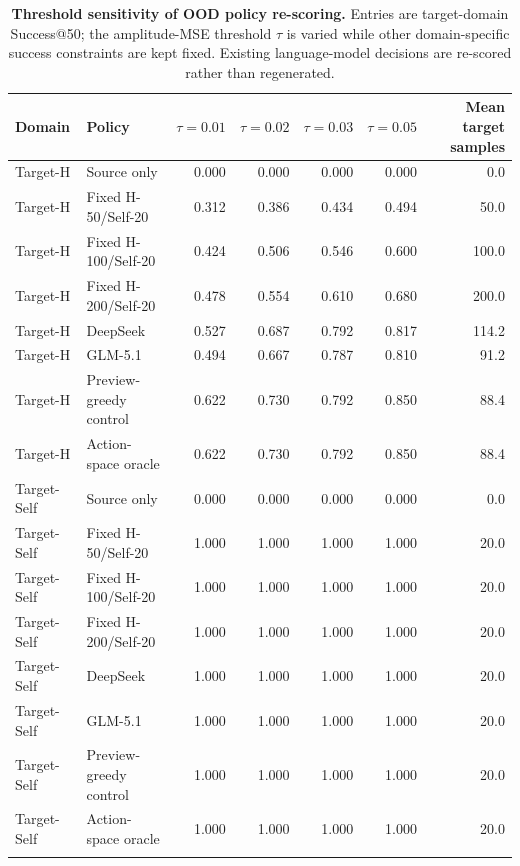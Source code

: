 \documentclass[final,1p,times]{elsarticle}
\begin{document}
\begin{table}[htbp!]
\caption{\textbf{Threshold sensitivity of OOD policy re-scoring.}
Entries are target-domain Success@50; the amplitude-MSE threshold $\tau$ is varied while other domain-specific success constraints are kept fixed. Existing language-model decisions are re-scored rather than regenerated.}
\label{tab:si_ood_threshold_sensitivity}
\centering
\small
\setlength{\tabcolsep}{3.8pt}
\renewcommand{\arraystretch}{1.12}
\begin{tabular}{llrrrrr}
\toprule
Domain & Policy & $\tau=0.01$ & $\tau=0.02$ & $\tau=0.03$ & $\tau=0.05$ & Mean target samples \\
\midrule
Target-H & Source only & 0.000 & 0.000 & 0.000 & 0.000 & 0.0 \\
Target-H & Fixed H-50/Self-20 & 0.312 & 0.386 & 0.434 & 0.494 & 50.0 \\
Target-H & Fixed H-100/Self-20 & 0.424 & 0.506 & 0.546 & 0.600 & 100.0 \\
Target-H & Fixed H-200/Self-20 & 0.478 & 0.554 & 0.610 & 0.680 & 200.0 \\
Target-H & DeepSeek & 0.527 & 0.687 & 0.792 & 0.817 & 114.2 \\
Target-H & GLM-5.1 & 0.494 & 0.667 & 0.787 & 0.810 & 91.2 \\
Target-H & Preview-greedy control & 0.622 & 0.730 & 0.792 & 0.850 & 88.4 \\
Target-H & Action-space oracle & 0.622 & 0.730 & 0.792 & 0.850 & 88.4 \\
\addlinespace
Target-Self & Source only & 0.000 & 0.000 & 0.000 & 0.000 & 0.0 \\
Target-Self & Fixed H-50/Self-20 & 1.000 & 1.000 & 1.000 & 1.000 & 20.0 \\
Target-Self & Fixed H-100/Self-20 & 1.000 & 1.000 & 1.000 & 1.000 & 20.0 \\
Target-Self & Fixed H-200/Self-20 & 1.000 & 1.000 & 1.000 & 1.000 & 20.0 \\
Target-Self & DeepSeek & 1.000 & 1.000 & 1.000 & 1.000 & 20.0 \\
Target-Self & GLM-5.1 & 1.000 & 1.000 & 1.000 & 1.000 & 20.0 \\
Target-Self & Preview-greedy control & 1.000 & 1.000 & 1.000 & 1.000 & 20.0 \\
Target-Self & Action-space oracle & 1.000 & 1.000 & 1.000 & 1.000 & 20.0 \\
\addlinespace
\bottomrule
\end{tabular}
\end{table}
\end{document}
